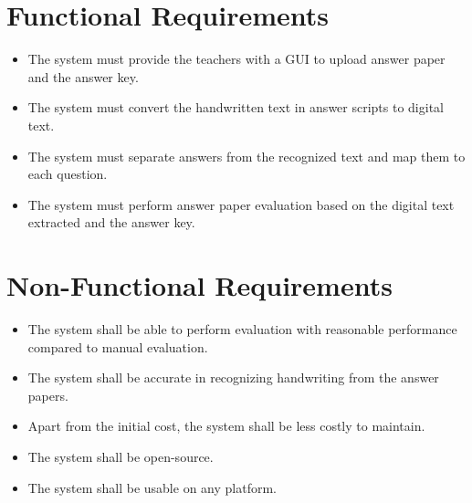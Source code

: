 \section{Functional Requirements}
\begin{itemize}
    \item The system must provide the teachers with a GUI to
    upload answer paper and the answer key.
    \item The system must convert the handwritten text in 
    answer scripts to digital text.
    \item The system must separate answers from the recognized
    text and map them to each question.
    \item The system must perform answer paper evaluation
    based on the digital text extracted and the answer key.
\end{itemize}

\section{Non-Functional Requirements}
\begin{itemize}
    \item The system shall be able to perform evaluation with
    reasonable performance compared to manual evaluation.
    \item The system shall be accurate in recognizing handwriting
    from the answer papers.
    \item Apart from the initial cost, the system shall be less
    costly to maintain.
    \item The system shall be open-source.
    \item The system shall be usable on any platform.
\end{itemize}